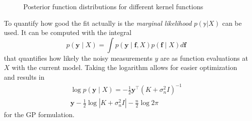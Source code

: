     \begin{figure}[ht]
        \centering
        \quad
        \caption[Posterior distribution examples]{\label{f:interfunction}Posterior function distributions for different kernel functions}
    \end{figure}
    \newline
    To quantify how good the fit actually is the \textit{marginal likelihood} $p(\mathbb y|X)$ can be used. It can be computed with the integral
    $$
    p(\mathbf{y} \mid X)=\int p(\mathbf{y} \mid \mathbf{f}, X) p(\mathbf{f} \mid X) d \mathbf{f}
    $$
    that quantifies how likely the noisy measurements $y$ are as function evaluations at $X$ with the current model. Taking the logarithm allows for easier optimization and results in 
    \begin{align*}
        \log p(\mathbf{y} \mid X)=-\frac{1}{2} \mathbf{y}^{\top}\left(K+\sigma_{n}^{2} I\right)^{-1} \\ \mathbf{y}-\frac{1}{2} \log \left|K+\sigma_{n}^{2} I\right|-\frac{n}{2} \log 2 \pi
    \end{align*}
    for the GP formulation.
    \newpage
